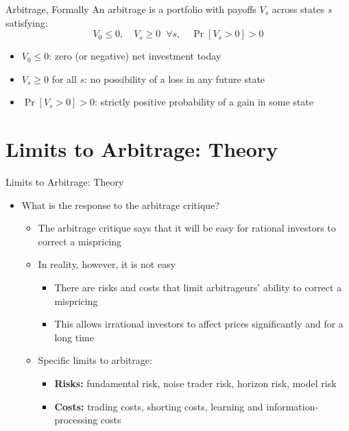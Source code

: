 \documentclass[aspectratio=169, 11pt]{beamer}
\begin{document}
\begin{frame}{Arbitrage, Formally}
An arbitrage is a portfolio with payoffs $V_s$ across states $s$ satisfying:
\[
V_0 \leq 0, \quad V_s \geq 0 \;\; \forall s, \quad \Pr[V_s > 0] > 0
\]
\begin{itemize}
\item $V_0 \leq 0$: zero (or negative) net investment today
\item $V_s \geq 0$ for all $s$: no possibility of a loss in any future state
\item $\Pr[V_s > 0] > 0$: strictly positive probability of a gain in some state
\end{itemize}
\end{frame}

\section{Limits to Arbitrage: Theory}

\begin{frame}{Limits to Arbitrage: Theory}
\begin{itemize}
\item What is the response to the arbitrage critique?
  \begin{itemize}
  \item The arbitrage critique says that it will be easy for rational investors to correct a mispricing
  \item In reality, however, it is not easy
    \begin{itemize}
    \item There are risks and costs that limit arbitrageurs' ability to correct a mispricing
    \item This allows irrational investors to affect prices significantly and for a long time
    \end{itemize}
  \item Specific limits to arbitrage:
    \begin{itemize}
    \item \textbf{Risks:} fundamental risk, noise trader risk, horizon risk, model risk
    \item \textbf{Costs:} trading costs, shorting costs, learning and information-processing costs
    \end{itemize}
  \end{itemize}
\end{itemize}
\end{frame}
\end{document}
